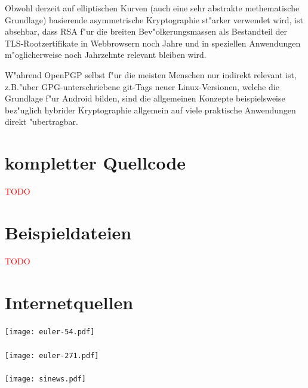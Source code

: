 \documentclass[12pt]{article}
\newcommand{\todo}[1]{\textcolor{red}{\mbox{TODO}}\marginpar{\textcolor{red}{#1}}}
\begin{document}
Obwohl derzeit auf elliptischen Kurven (auch eine sehr abstrakte methematische Grundlage)
basierende asymmetrische Kryptographie st"arker verwendet wird,
ist absehbar, dass RSA f"ur die breiten Bev"olkerungsmassen als Bestandteil
der TLS-Rootzertifikate in Webbrowsern noch Jahre und in speziellen Anwendungen m"oglicherweise
noch Jahrzehnte relevant bleiben wird.

W"ahrend OpenPGP selbst f"ur die meisten Menschen nur indirekt relevant ist,
z.B.\@ "uber GPG-unterschriebene git-Tags neuer Linux-Versionen, welche die Grundlage f"ur Android bilden,
sind die allgemeinen Konzepte beispielsweise bez"uglich hybrider Kryptographie allgemein
auf viele praktische Anwendungen direkt "ubertragbar.

\appendix



\section{kompletter Quellcode}
\todo{sind ca. 30 Seiten}
\lstset{language=Python}
%
%
%
%
%
%
%
%
%
%

\section{Beispieldateien}

\todo{Hochladen}

\section{Internetquellen}

\paragraph{\cite{euler41}}
\texttt{[image: euler-54.pdf]}
\paragraph{\cite{euler63}}
\texttt{[image: euler-271.pdf]}
\paragraph{\cite{sinews}}
\texttt{[image: sinews.pdf]}
\end{document}
